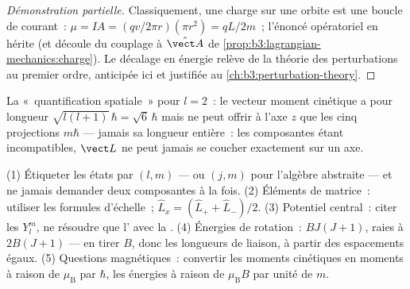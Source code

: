 \begin{proof}[Démonstration partielle]
Classiquement, une charge sur une orbite est une boucle de courant~: $\mu = IA =
(qv/2\pi r)(\pi r^2) = qL/2m$~; l'énoncé opératoriel en hérite (et
découle du couplage à $\hat{\vect A}$ de
\cref{prop:b3:lagrangian-mechanics:charge}). Le décalage en énergie
relève de la théorie des perturbations au premier ordre, anticipée ici
et justifiée au \cref{ch:b3:perturbation-theory}.
\end{proof}

\begin{omfigure}

{\small La «~quantification spatiale~» pour $l = 2$~: le vecteur
moment cinétique a pour longueur $\sqrt{l(l+1)}\,\hbar = \sqrt6\,\hbar$
mais ne peut offrir à l'axe $z$ que les cinq projections $m\hbar$ ---
jamais sa longueur entière~: les composantes étant incompatibles,
$\vect L$ ne peut jamais se coucher exactement sur un axe.}
\end{omfigure}

\begin{method}\label{met:b3:quantum-angular-momentum:method}
(1) Étiqueter les états par $(l, m)$ --- ou $(j, m)$ pour l'algèbre
abstraite --- et ne jamais demander deux composantes à la fois. (2)
Éléments de matrice~: utiliser les formules d'échelle~; $\hat L_x = (\hat L_+ + \hat
L_-)/2$. (3) Potentiel central~: citer les $Y_l^m$, ne résoudre que
l' avec la . (4) Énergies de
rotation~: $BJ(J+1)$, raies à $2B(J+1)$ --- en tirer $B$, donc les
longueurs de liaison, à partir des espacements égaux. (5) Questions
magnétiques~: convertir les moments cinétiques en moments à raison de
$\mu_{\text{B}}$ par $\hbar$, les énergies à raison de
$\mu_{\text{B}}B$ par unité de $m$.
\end{method}

